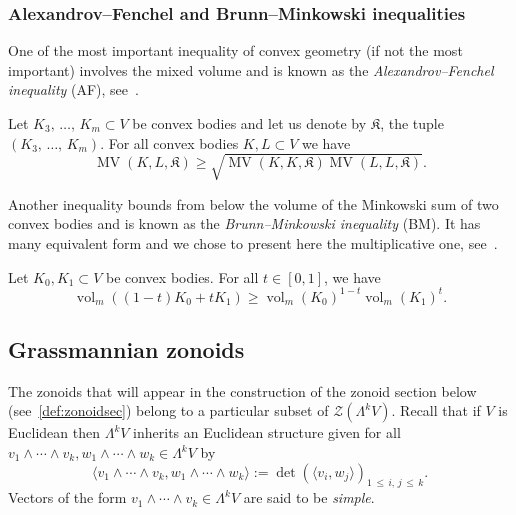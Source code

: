 \documentclass[10pt]{amsart}
\theoremstyle{definition}\newtheorem{defi}[theo]{Definition}\newtheorem{rema}[theo]{Remark}\newtheorem{exam}[theo]{Example}\newtheorem{exem}[theo]{Example}\newtheorem{nota}[theo]{Notation}
\newcommand{\fkK}{\mathfrak{K}}
\newcommand{\ZZ}{\mathscr{Z}}
\DeclareMathOperator{\vol}{vol}
\DeclareMathOperator{\MV}{MV}
\begin{document}
\subsubsection{Alexandrov--Fenchel and Brunn--Minkowski inequalities} 

One of the most important inequality of convex geometry (if not the most important) involves the mixed volume and is known as the \emph{Alexandrov--Fenchel inequality} (AF), see~\cite[Theorem~7.3.1]{bible}.
\begin{prop}[AF]\label{prop:AFi}
Let $K_3,\,\ldots,\,K_m\subset V$ be convex bodies and let us denote by $\fkK$, the tuple $(K_3,\,\ldots,\,K_m)$. For all convex bodies $K,L\subset V$ we have
\begin{equation*}
\MV(K,L,\fkK)\geq \sqrt{\MV(K,K,\fkK)\MV(L,L,\fkK)}.
\end{equation*}
\end{prop}

Another inequality bounds from below the volume of the Minkowski sum of two convex bodies and is known as the \emph{Brunn--Minkowski inequality} (BM). It has many equivalent form and we chose to present here the multiplicative one, see~\cite[p.~372~(e)]{bible}.

\begin{prop}[BM]\label{prop:BMi}
Let $K_0,K_1\subset V$ be convex bodies. For all $t\in[0,1]$, we have
\begin{equation*}
\vol_m((1-t)K_0+tK_1)\geq \vol_m(K_0)^{1-t}\vol_m(K_1)^t.
\end{equation*}
\end{prop}

\subsection{Grassmannian zonoids}\label{sec:grasszon}


The zonoids that will appear in the construction of the zonoid section below (see~\cref{def:zonoidsec}) belong to a particular subset of $\ZZ(\Lambda^k V)$. Recall that if $V$ is Euclidean then $\Lambda^k V$ inherits an Euclidean structure given for all $v_1\wedge\cdots\wedge v_k, w_1\wedge\cdots\wedge w_k\in\Lambda^k V$ by
\begin{equation*}
\langle v_1\wedge\cdots\wedge v_k, w_1\wedge\cdots\wedge w_k\rangle:=\det\left(\langle v_i, w_j\rangle\right)_{1\,\leq\,i,\,j\,\leq\,k}.
\end{equation*}
Vectors of the form $v_1\wedge\cdots\wedge v_k\in\Lambda^k V$ are said to be \emph{simple}.
\end{document}
